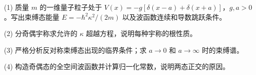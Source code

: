 (1) 质量 \(m\) 的一维量子粒子处于 \(V(x)=-g[\delta(x-a)+\delta(x+a)]\)，\(g,a>0\)。写出束缚态能量 \(E=-\hbar^2\kappa^2/(2m)\) 以及波函数连续和导数跳跃条件。

(2) 分奇偶宇称求允许的 \(\kappa\) 超越方程，说明每种宇称的根性质。

(3) 严格分析反对称束缚态出现的临界条件；求 \(a\to0\) 和 \(a\to\infty\) 时的束缚谱。

(4) 构造奇偶态的全空间波函数并计算归一化常数，说明两态正交的原因。
